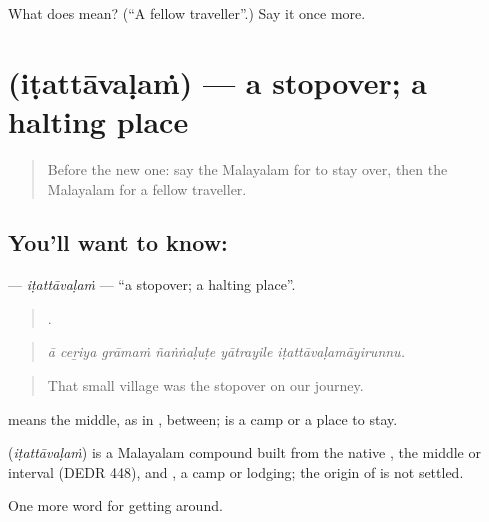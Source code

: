 \begin{tcolorbox}[breakable,colback=teal!4,colframe=teal!35!black,title={Before you move on}]
What does  mean? (\textquotedblleft{}A fellow traveller\textquotedblright{}.) Say it once more.
\end{tcolorbox}
\section[\texorpdfstring{\ml{ഇടത്താവളം} (iṭattāvaḷaṁ)}{ഇടത്താവളം (iṭattāvaḷaṁ)}]{ (iṭattāvaḷaṁ) — a stopover; a halting place}

\label{lesson:ML-C479-itattavalam}



\begin{quote}
Before the new one: say the Malayalam for to stay over, then the Malayalam for a fellow traveller.
\end{quote}

\subsection*{You'll want to know: }
\textbf{} — \emph{iṭattāvaḷaṁ} — \textquotedblleft{}a stopover; a halting place\textquotedblright{}.

\begin{quote}
     .
\end{quote}

\begin{quote}
\emph{ā ceṟiya grāmaṁ ñaṅṅaḷuṭe yātrayile iṭattāvaḷamāyirunnu.}
\end{quote}

\begin{quote}
That small village was the stopover on our journey.
\end{quote}

 means the middle, as in , between;  is a camp or a place to stay.

\begin{cousinweb}
\textbf{} (\emph{iṭattāvaḷaṁ}) is a Malayalam compound built from the native , the middle or interval (DEDR 448), and , a camp or lodging; the origin of  is not settled.
\end{cousinweb}

\begin{grammarlens}[title={What you've built}]
One more word for getting around.
\end{grammarlens}

